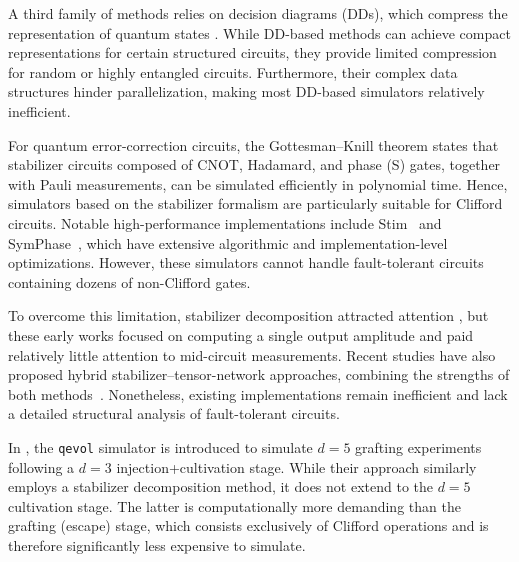 \documentclass[10pt,conference]{IEEEtran}
\begin{document}
A third family of methods relies on decision diagrams (DDs), which compress the representation of quantum states \cite{hong2020tensor, vinkhuijzen2023limdd, sistla2023symbolic}.
While DD-based methods can achieve compact representations for certain structured circuits, they provide limited compression for random or highly entangled circuits.
Furthermore, their complex data structures hinder parallelization, making most DD-based simulators relatively inefficient.

For quantum error-correction circuits, the Gottesman–Knill theorem states that stabilizer circuits composed of CNOT, Hadamard, and phase (S) gates, together with Pauli measurements, can be simulated efficiently in polynomial time.
Hence, simulators based on the stabilizer formalism are particularly suitable for Clifford circuits.
Notable high-performance implementations include Stim~\cite{gidney2021stim} and SymPhase~\cite{fang2024symphase}, which have extensive algorithmic and implementation-level optimizations.
However, these simulators cannot handle fault-tolerant circuits containing dozens of non-Clifford gates. 

To overcome this limitation, stabilizer decomposition attracted attention \cite{bravyi2016improved, bravyi2019simulation}, but these early works focused on computing a single output amplitude and paid relatively little attention to mid-circuit measurements. Recent studies have also proposed hybrid stabilizer–tensor-network approaches, combining the strengths of both methods~\cite{masot2024stn, nakhl2025stn}.
Nonetheless, existing implementations remain inefficient and lack a detailed structural analysis of fault-tolerant circuits. 

In \cite{rosenfeld2025magic}, the \texttt{qevol} simulator is introduced to simulate $d=5$ grafting experiments following a $d=3$ injection+cultivation stage. While their approach similarly employs a stabilizer decomposition method, it does not extend to the $d=5$ cultivation stage. The latter is computationally more demanding than the grafting (escape) stage, which consists exclusively of Clifford operations and is therefore significantly less expensive to simulate.

\end{document}

